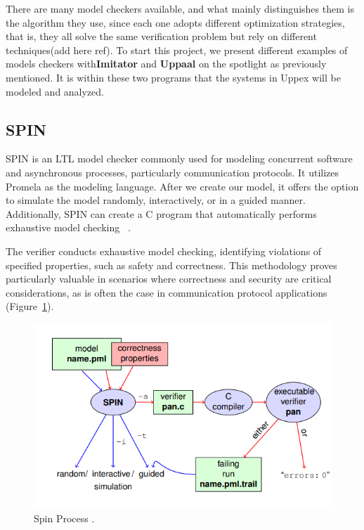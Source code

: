 
There are many model checkers available, and what mainly distinguishes them is the algorithm they use, since each one adopts different optimization strategies, that is, they all solve the same verification problem but rely on different techniques(add here ref). To start this project, we present different examples of models checkers with\textbf{Imitator} and \textbf{Uppaal} on the spotlight as previously mentioned. It is within these two programs that the systems in Uppex will be modeled and analyzed.

\subsection*{SPIN}

 SPIN is an LTL model checker commonly used for modeling concurrent software and asynchronous processes, particularly communication protocols. It utilizes Promela as the modeling language. After we create our model, it offers the option to simulate the model randomly, interactively, or in a guided manner. Additionally, SPIN can create a C program that automatically performs exhaustive model checking ~\cite{spin}.

The verifier conducts exhaustive model checking, identifying violations of specified properties, such as safety and correctness. This methodology proves particularly valuable in scenarios where correctness and security are critical considerations, as is often the case in communication protocol applications (Figure~\ref{fig:Spin}).

\begin{figure} [H]
    \centering
    \includegraphics[width=0.75\linewidth]{chapters/spin.png}
    \caption[Spin Process]{Spin Process \cite{spin}.}
    \label{fig:Spin}
\end{figure}

